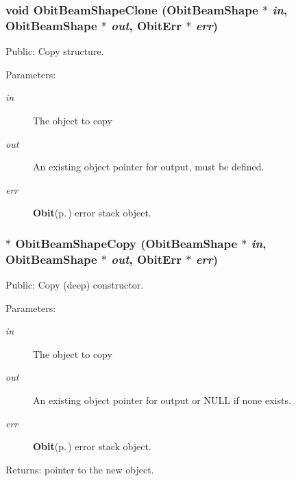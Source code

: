 \subsubsection{\setlength{\rightskip}{0pt plus 5cm}void Obit\-Beam\-Shape\-Clone ({\bf Obit\-Beam\-Shape} $\ast$ {\em in}, {\bf Obit\-Beam\-Shape} $\ast$ {\em out}, {\bf Obit\-Err} $\ast$ {\em err})}\label{ObitBeamShape_8c_a9}


Public: Copy structure. 

\begin{Desc}
\item[Parameters:]
\begin{description}
\item[{\em in}]The object to copy \item[{\em out}]An existing object pointer for output, must be defined. \item[{\em err}]{\bf Obit}{\rm (p.\,\pageref{structObit})} error stack object. \end{description}
\end{Desc}
\subsubsection{$\ast$ Obit\-Beam\-Shape\-Copy ({\bf Obit\-Beam\-Shape} $\ast$ {\em in}, {\bf Obit\-Beam\-Shape} $\ast$ {\em out}, {\bf Obit\-Err} $\ast$ {\em err})}\label{ObitBeamShape_8c_a8}


Public: Copy (deep) constructor. 

\begin{Desc}
\item[Parameters:]
\begin{description}
\item[{\em in}]The object to copy \item[{\em out}]An existing object pointer for output or NULL if none exists. \item[{\em err}]{\bf Obit}{\rm (p.\,\pageref{structObit})} error stack object. \end{description}
\end{Desc}
\begin{Desc}
\item[Returns:]pointer to the new object. \end{Desc}
